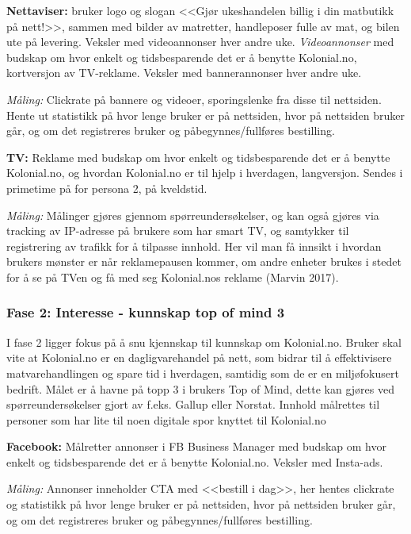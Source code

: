 \textbf{Nettaviser:} 
 bruker logo og slogan <<Gjør ukeshandelen billig i din matbutikk på nett!>>, sammen med bilder av matretter, handleposer fulle av mat, og bilen ute på levering. Veksler med videoannonser hver andre uke. 
\textit{Videoannonser} med budskap om hvor enkelt og tidsbesparende det er å benytte Kolonial.no, kortversjon av TV-reklame. Veksler med bannerannonser hver andre uke. 

\textit{Måling:}
Clickrate på bannere og videoer, sporingslenke fra disse til nettsiden. Hente ut statistikk på hvor lenge bruker er på nettsiden, hvor på nettsiden bruker går, og om det registreres bruker og påbegynnes/fullføres bestilling. 

\textbf{TV:} Reklame med budskap om hvor enkelt og tidsbesparende det er å benytte Kolonial.no, og hvordan Kolonial.no er til hjelp i hverdagen, langversjon. Sendes i primetime på for persona 2, på kveldstid. 

\textit{Måling:} Målinger gjøres gjennom spørreundersøkelser, og kan også gjøres via tracking av IP-adresse på brukere som har smart TV, og samtykker til registrering av trafikk for å tilpasse innhold. Her vil man få innsikt i hvordan brukers mønster er når reklamepausen kommer, om andre enheter brukes i stedet for å se på TVen og få med seg Kolonial.nos reklame (Marvin 2017). 

\subsubsection{\textbf{Fase 2: Interesse - kunnskap top of mind 3}}
I fase 2 ligger fokus på å snu kjennskap til kunnskap om Kolonial.no. Bruker skal vite at Kolonial.no er en dagligvarehandel på nett, som bidrar til å effektivisere matvarehandlingen og spare tid i hverdagen, samtidig som de er en miljøfokusert bedrift. Målet er å havne på topp 3 i brukers Top of Mind, dette kan gjøres ved spørreundersøkelser gjort av f.eks. Gallup eller Norstat. Innhold målrettes til personer som har lite til noen digitale spor knyttet til Kolonial.no 

\textbf{Facebook:} Målretter annonser i FB Business Manager med budskap om hvor enkelt og tidsbesparende det er å benytte Kolonial.no. Veksler med Insta-ads. 

\textit{Måling:} Annonser inneholder CTA med <<bestill i dag>>, her hentes clickrate og statistikk på hvor lenge bruker er på nettsiden, hvor på nettsiden bruker går, og om det registreres bruker og påbegynnes/fullføres bestilling. 

